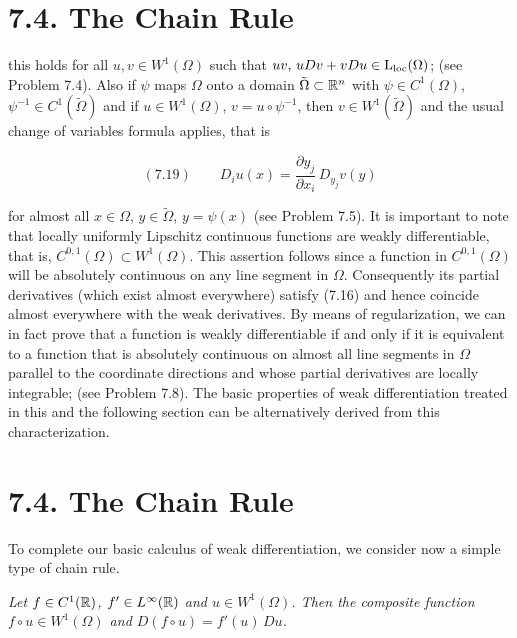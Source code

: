 

\section*{7.4. The Chain Rule}

this holds for all $u, v \in W^1(\Omega)$ such that $uv,\, uDv + vDu \in \operatorname{L_{\mathrm{loc}}}(\Omega)$; (see Problem 7.4). Also if $\psi$ maps $\Omega$ onto a domain $\tilde{\Omega} \subset \mathbb{R}^n$ with $\psi \in C^1(\Omega)$, $\psi^{-1} \in C^1(\tilde{\Omega})$ and if $u \in W^1(\Omega)$, $v = u \circ \psi^{-1}$, then $v \in W^1(\tilde{\Omega})$ and the usual change of variables formula applies, that is

\[
(7.19)\qquad D_i u(x)=\frac{\partial y_j}{\partial x_i}\, D_{y_j} v(y)
\]

for almost all $x \in \Omega$, $y \in \tilde{\Omega}$, $y=\psi(x)$ (see Problem 7.5).
It is important to note that locally uniformly Lipschitz continuous functions are weakly differentiable, that is, $C^{0,1}(\Omega)\subset W^1(\Omega)$. This assertion follows since a function in $C^{0,1}(\Omega)$ will be absolutely continuous on any line segment in $\Omega$. Consequently its partial derivatives (which exist almost everywhere) satisfy (7.16) and hence coincide almost everywhere with the weak derivatives. By means of regularization, we can in fact prove that a function is weakly differentiable if and only if it is equivalent to a function that is absolutely continuous on almost all line segments in $\Omega$ parallel to the coordinate directions and whose partial derivatives are locally integrable; (see Problem 7.8). The basic properties of weak differentiation treated in this and the following section can be alternatively derived from this characterization.

\section*{7.4. The Chain Rule}

To complete our basic calculus of weak differentiation, we consider now a simple type of chain rule.

\begin{lemma}\label{gt:lem-sobolev-chain-rule-c1}
\emph{Let $f \in C^1(\mathbb{R})$, $f' \in L^\infty(\mathbb{R})$ and $u \in W^1(\Omega)$. Then the composite function $f \circ u \in W^1(\Omega)$ and $D(f \circ u)=f'(u)\, Du$.}
\end{lemma}

